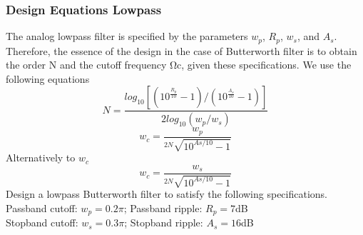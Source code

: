 \documentclass{article}
\begin{document}
\subsubsection{Design Equations Lowpass}
The analog lowpass filter is specified by the parameters $w_p$, $R_p$, $w_s$, and $A_s$. Therefore, the essence of the design in the case of Butterworth filter is to obtain the order N and the cutoff frequency Ωc, given these specifications. We use the following equations
\begin{equation}
N = \frac{log_{10}[(10^\frac{R_p}{10}-1)/(10^\frac{A_s}{10}-1)]}{2log_{10}(w_p/w_s)}
\end{equation}
\begin{equation}
w_c = \frac{w_p}{^{2N}\sqrt{10^{As/10}-1}}
\end{equation}
Alternatively to $w_c$
\begin{equation}
w_c = \frac{w_s}{^{2N}\sqrt{10^{As/10}-1}}
\end{equation}
Design a lowpass Butterworth filter to satisfy the following specifications.
\vspace{1em}
Passband cutoff: $w_p=0.2\pi$; Passband ripple: $R_p=7$dB \\
\vspace{1em}
Stopband cutoff: $w_s= 0.3 \pi$; Stopband ripple: $A_s = 16$dB
\end{document}

